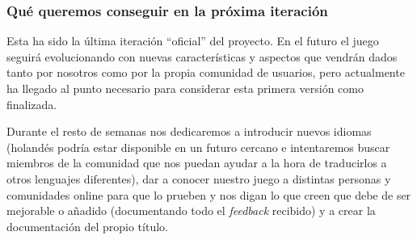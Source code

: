 \subsubsection{Qué queremos conseguir en la próxima iteración}
Esta ha sido la última iteración ``oficial'' del proyecto. En el futuro el juego seguirá evolucionando con nuevas características y aspectos que vendrán dados tanto por nosotros como por la propia comunidad de usuarios, pero actualmente ha llegado al punto necesario para considerar esta primera versión como finalizada.

Durante el resto de semanas nos dedicaremos a introducir nuevos idiomas (holandés podría estar disponible en un futuro cercano e intentaremos buscar miembros de la comunidad que nos puedan ayudar a la hora de traducirlos a otros lenguajes diferentes), dar a conocer nuestro juego a distintas personas y comunidades online para que lo prueben y nos digan lo que creen que debe de ser mejorable o añadido (documentando todo el \textit{feedback} recibido) y a crear la documentación del propio título.